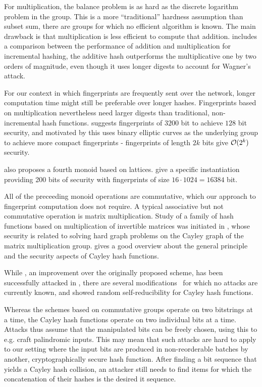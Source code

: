 For multiplication, the balance problem is as hard as the discrete logarithm problem in the group. This is a more ``traditional'' hardness assumption than subset sum, there are groups for which no efficient algorithm is known. The main drawback is that multiplication is less efficient to compute that addition. \cite{stanton2010fastad} includes a comparison between the performance of addition and multiplication for incremental hashing, the additive hash outperforms the multiplicative one by two orders of magnitude, even though it uses longer digests to account for Wagner's attack.

For our context in which fingerprints are frequently sent over the network, longer computation time might still be preferable over longer hashes. Fingerprints based on multiplication nevertheless need larger digests than traditional, non-incremental hash functions. \cite{maitin2017elliptic} suggests fingerprints of $3200$ bit to achieve $128$ bit security, and motivated by this uses binary elliptic curves as the underlying group to achieve more compact fingerprints - fingerprints of length $2k$ bits give $\mathcal{O}(2^k)$ security.

\cite{bellare1997new} also proposes a fourth monoid based on lattices. \cite{lewi2019securing} give a specific instantiation providing 200 bits of security with fingerprints of size $16 \cdot 1024 = 16384$ bit.

All of the preceeding monoid operations are commutative, which our approach to fingerprint computation does not require. A typical associative but not commutative operation is matrix multiplication. Study of a family of hash functions based on multiplication of invertible matrices was initiated in \cite{zemor1991hash}, whose security is related to solving hard graph problems on the Cayley graph of the matrix multiplication group. \cite{petit2011rubik} gives a good overview about the general principle and the security aspects of Cayley hash functions.

While \cite{tillich1994hashing}, an improvement over the originally proposed scheme, has been successfully attacked in \cite{grassl2011cryptanalysis}\cite{petit2010preimages}, there are several modifications~\cite{petit2009graph}\cite{bromberg2017navigating}\cite{sosnovski2016cayley} for which no attacks are currently known, and \cite{mullan2016text} showed random self-reducibility for Cayley hash functions.

Whereas the schemes based on commutative groups operate on two bitstrings at a time, the Cayley hash functions operate on two individual bits at a time. Attacks thus assume that the manipulated bits can be freely chosen, using this to e.g. craft palindromic inputs. This may mean that such attacks are hard to apply to our setting where the input bits are produced in non-reorderable batches by another, cryptographically secure hash function. After finding a bit sequence that yields a Cayley hash collision, an attacker still needs to find items for which the concatenation of their hashes is the desired it sequence.

